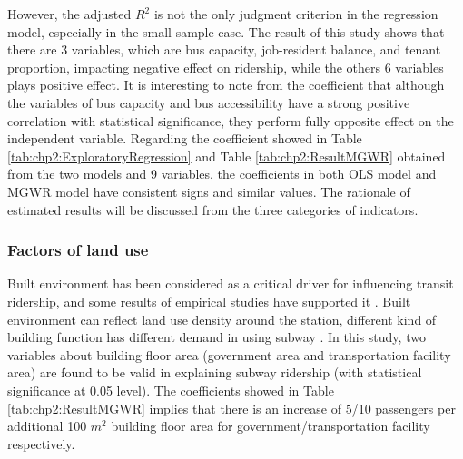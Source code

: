 %
However, the adjusted $R^2$ is not the only judgment criterion in the regression model, especially in the small sample case. The result of this study shows that there are 3 variables, which are bus capacity, job-resident balance, and tenant proportion, impacting negative effect on ridership, while the others 6 variables plays positive effect. It is interesting to note from the coefficient that although the variables of bus capacity and bus accessibility have a strong positive correlation with statistical significance, they perform fully opposite effect on the independent variable. Regarding the coefficient showed in Table \ref{tab:chp2:ExploratoryRegression} and Table \ref{tab:chp2:ResultMGWR} obtained from the two models and 9 variables, the coefficients in both OLS model and MGWR model have consistent signs and similar values. The rationale of estimated results will be discussed from the three categories of indicators.

%
\subsubsection{Factors of land use}
%
Built environment has been considered as a critical driver for influencing transit ridership, and some results of empirical studies have supported it \cite{sohn2010factors,zhao2013influences,chakraborty2013land}. Built environment can reflect land use density around the station, different kind of building function has different demand in using subway \cite{chakraborty2013land}. In this study, two variables about building floor area (government area and transportation facility area) are found to be valid in explaining subway ridership (with statistical significance at 0.05 level). The coefficients showed in Table \ref{tab:chp2:ResultMGWR} implies that there is an increase of 5/10 passengers per additional 100 $m^2$ building floor area for government/transportation facility respectively. 


